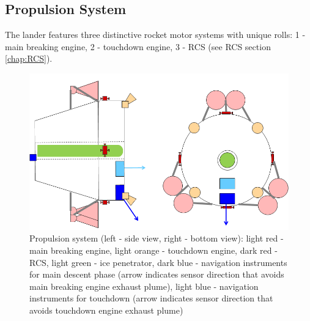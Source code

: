 \subsection{Propulsion System}
The lander features three distinctive rocket motor systems with unique rolls: 1 - main breaking engine, 2 - touchdown engine, 3 - RCS (see RCS section \ref{chap:RCS}).

\begin{figure}[htb]
	\centering
	\includegraphics[width=\textwidth]{figures/Lander/aaronlanderprop}
	\caption{Propulsion system (left - side view, right - bottom view): light red - main breaking engine, light orange - touchdown engine, dark red - RCS, light green - ice penetrator, dark blue - navigation instruments for main descent phase (arrow indicates sensor direction that avoids main breaking engine exhaust plume), light blue - navigation instruments for touchdown (arrow indicates sensor direction that avoids touchdown engine exhaust plume)\label{fig:alanderprop}}
\end{figure}

